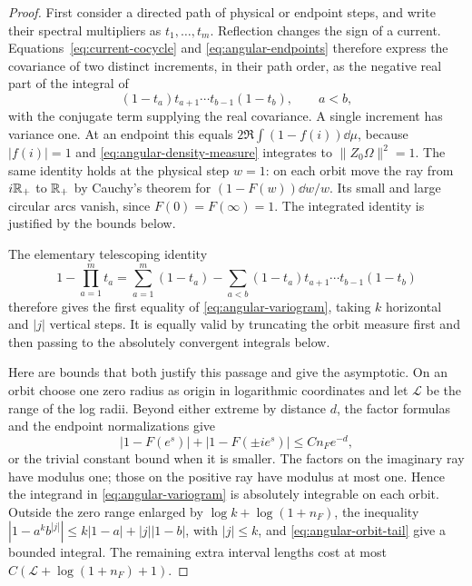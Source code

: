 \begin{proof}
First consider a directed path of physical or endpoint steps, and write
their spectral multipliers as $t_1,\ldots,t_m$.  Reflection changes
the sign of a current.  Equations~\eqref{eq:current-cocycle} and
\eqref{eq:angular-endpoints} therefore express the covariance of two
distinct increments, in their path order, as the negative real part of
the integral of
\[
 (1-t_a)t_{a+1}\cdots t_{b-1}(1-t_b),\qquad a<b,
\]
with the conjugate term supplying the real covariance.  A single
increment has variance one.  At an endpoint this equals
$2\Re\int(1-f(i))\dd\mu$, because $|f(i)|=1$ and
\eqref{eq:angular-density-measure} integrates to
$\|Z_0\Omega\|^2=1$.  The same identity holds at the physical step
$w=1$: on each orbit move the ray from $i\mathbb R_+$ to $\mathbb R_+$ by Cauchy's
theorem for $(1-F(w))\dd w/w$.  Its small and large circular arcs
vanish, since $F(0)=F(\infty)=1$.  The integrated identity is
justified by the bounds below.

The elementary telescoping identity
\[
 1-\prod_{a=1}^m t_a
 =\sum_{a=1}^m(1-t_a)
  -\sum_{a<b}(1-t_a)t_{a+1}\cdots t_{b-1}(1-t_b)
\]
therefore gives the first equality of
\eqref{eq:angular-variogram}, taking $k$ horizontal and $|j|$
vertical steps.  It is equally valid by truncating the orbit measure
first and then passing to the absolutely convergent integrals below.

Here are bounds that both justify this passage and give the asymptotic.
On an orbit choose one zero radius as origin in logarithmic coordinates
and let $\mathcal L$ be the range of the log radii.  Beyond either
extreme by distance $d$, the factor formulas and the endpoint
normalizations give
\begin{equation}\label{eq:angular-orbit-tail}
 |1-F(e^s)|+|1-F(\pm i e^s)|\le Cn_F e^{-d},
\end{equation}
or the trivial constant bound when it is smaller.  The factors on the
imaginary ray have modulus one; those on the positive ray have modulus
at most one.  Hence the integrand in
\eqref{eq:angular-variogram} is absolutely integrable on each orbit.
Outside the zero range enlarged by $\log k+\log(1+n_F)$, the inequality
$|1-a^kb^{|j|}|\le k|1-a|+|j||1-b|$, with $|j|\le k$, and
\eqref{eq:angular-orbit-tail} give a bounded integral.  The remaining
extra interval lengths cost at most
$C(\mathcal L+\log(1+n_F)+1)$.


\end{proof}
